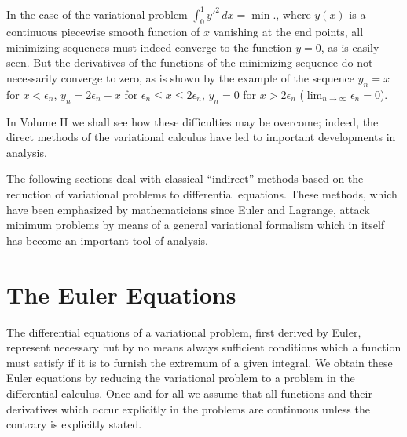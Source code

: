 In the case of the variational problem $\int_0^1y'^2\,dx=\min.$, where $y(x)$ is a continuous piecewise smooth function of $x$ vanishing at the end points, all minimizing sequences must indeed converge to the function $y=0$, as is easily seen. But the derivatives of the functions of the minimizing sequence do not necessarily converge to zero, as is shown by the example of the sequence $y_n=x$ for $x<\epsilon_n$, $y_n=2\epsilon_n-x$ for $\epsilon_n\le x\le2\epsilon_n$, $y_n=0$ for $x>2\epsilon_n$ ($\lim_{n\to\infty}\epsilon_n=0$).

In Volume II we shall see how these difficulties may be overcome; indeed, the direct methods of the variational calculus have led to important developments in analysis.

The following sections deal with classical ``indirect'' methods based on the reduction of variational problems to differential equations. These methods, which have been emphasized by mathematicians since Euler and Lagrange, attack minimum problems by means of a general variational formalism which in itself has become an important tool of analysis.

\section{The Euler Equations}
The differential equations of a variational problem, first derived by Euler, represent necessary but by no means always sufficient conditions which a function must satisfy if it is to furnish the extremum of a given integral. We obtain these Euler equations by reducing the variational problem to a problem in the differential calculus. Once and for all we assume that all functions and their derivatives which occur explicitly in the problems are continuous unless the contrary is explicitly stated.

